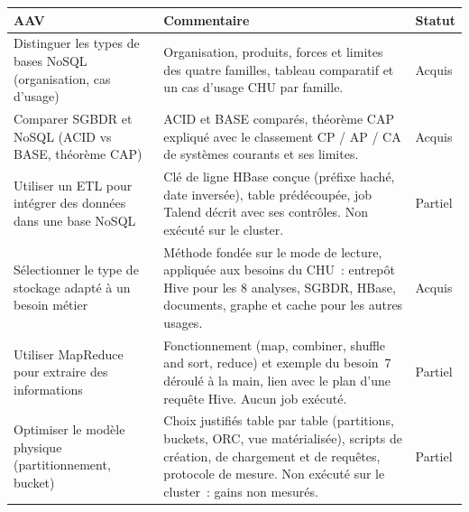 \begin{center}
\small
\setlength{\tabcolsep}{8pt}
\renewcommand{\arraystretch}{1.15}

\begin{tabular}{|>{\raggedright\arraybackslash}p{}|>{\raggedright\arraybackslash}p{}|m{}|}
\hline
\textbf{AAV} & \textbf{Commentaire} & \textbf{Statut} \\ \hline

Distinguer les types de bases NoSQL (organisation, cas d'usage) &
Organisation, produits, forces et limites des quatre familles, tableau comparatif et un cas d'usage CHU par famille. &
{\color{green!60!black}Acquis} \\ \hline

Comparer SGBDR et NoSQL (ACID vs BASE, théorème CAP) &
ACID et BASE comparés, théorème CAP expliqué avec le classement CP / AP / CA de systèmes courants et ses limites. &
{\color{green!60!black}Acquis} \\ \hline

Utiliser un ETL pour intégrer des données dans une base NoSQL &
Clé de ligne HBase conçue (préfixe haché, date inversée), table prédécoupée, job Talend décrit avec ses contrôles. Non exécuté sur le cluster. &
{\color{orange}Partiel} \\ \hline

Sélectionner le type de stockage adapté à un besoin métier &
Méthode fondée sur le mode de lecture, appliquée aux besoins du CHU~: entrepôt Hive pour les 8 analyses, SGBDR, HBase, documents, graphe et cache pour les autres usages. &
{\color{green!60!black}Acquis} \\ \hline

Utiliser MapReduce pour extraire des informations &
Fonctionnement (map, combiner, shuffle and sort, reduce) et exemple du besoin~7 déroulé à la main, lien avec le plan d'une requête Hive. Aucun job exécuté. &
{\color{orange}Partiel} \\ \hline

Optimiser le modèle physique (partitionnement, bucket) &
Choix justifiés table par table (partitions, buckets, ORC, vue matérialisée), scripts de création, de chargement et de requêtes, protocole de mesure. Non exécuté sur le cluster~: gains non mesurés. &
{\color{orange}Partiel} \\ \hline

\end{tabular}
\end{center}

